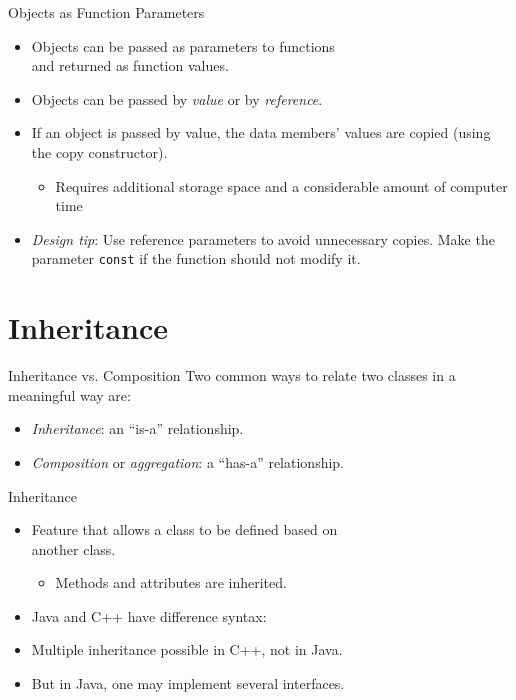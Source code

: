 \documentclass[14pt, aspectratio=1610, hyperref={pdfpagelayout=SinglePage}]{beamer}
\begin{document}
\begin{frame}{Objects as Function Parameters}
\begin{itemize}
\item<1->
  Objects can be passed as parameters to functions\\ and returned as function values.
\item<2->
  Objects can be passed by \emph{value} or by \emph{reference}.
\item<3->
  If an object is passed by value, the data members' values are copied (using the copy constructor).
  \begin{itemize}
  \item Requires additional storage space and a considerable amount of computer time
  \end{itemize}
\item<4->
  \emph{Design tip}: Use reference parameters to avoid unnecessary copies. Make the parameter \lstinline{const} if the function should not modify it.
\end{itemize}
\end{frame}



\section{Inheritance}

\begin{frame}{Inheritance vs. Composition}
Two common ways to relate two classes in a meaningful way are:
\begin{itemize}
\item
  \emph{Inheritance}: an ``is-a'' relationship.
\item
  \emph{Composition} or \emph{aggregation}: a ``has-a'' relationship.
\end{itemize}
\end{frame}

\begin{frame}{Inheritance}
\begin{itemize}
\item Feature that allows a class to be defined based on\\ another class.
\begin{itemize}
\item Methods and attributes are inherited.
\end{itemize}
\item Java and C++ have difference syntax:
\item Multiple inheritance possible in C++, not in Java.
\item But in Java, one may implement several interfaces.
\end{itemize}
\end{frame}
\end{document}
